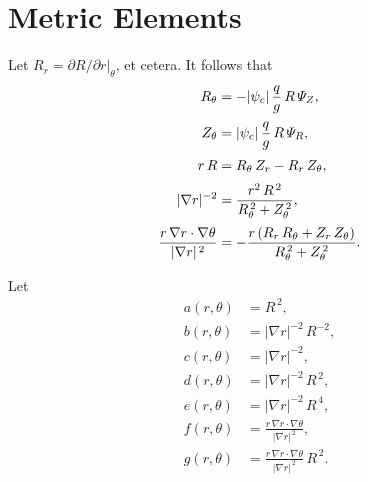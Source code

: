 \documentclass[notitlepage,12pt]{article}
\begin{document}
\section{Metric Elements}
Let $R_r=\left.\partial R/\partial r\right|_\theta$, et cetera. It follows that
\begin{align}
R_\theta&=-|\psi_c|\,\frac{q}{g}\,R\,{\mit\Psi}_Z,\\[0.5ex]
Z_\theta&= |\psi_c|\,\frac{q}{g}\,R\,{\mit\Psi}_R,\\[0.5ex]
r\,R&= R_\theta\,Z_r-R_r\,Z_\theta,\\[0.5ex]
|\nabla r|^{-2} &= \frac{r^2\,R^{\,2}}{R_\theta^{\,2} + Z_\theta^{\,2}},\\[0.5ex]
\frac{r\,\nabla r\cdot\nabla\theta}{|\nabla r|^{\,2}} &= -\frac{r\,(R_r\,R_\theta + Z_r\,Z_\theta)}{R_\theta^{\,2}+Z_\theta^{\,2}}.
\end{align}

Let 
\begin{align}
a(r,\theta)&= R^{\,2},\\[0.5ex]
b(r,\theta) &= |\nabla r|^{-2}\,R^{-2},\\[0.5ex]
c(r,\theta)&= |\nabla r|^{-2},\\[0.5ex]
d(r,\theta)&= |\nabla r|^{-2}\,R^{\,2},\\[0.5ex]
e(r,\theta)&=|\nabla r|^{-2}\,R^{\,4},\\[0.5ex]
f(r,\theta)&= \frac{r\,\nabla r\cdot\nabla\theta}{|\nabla r|^{\,2}},\\[0.5ex]
g(r,\theta)&=\frac{r\,\nabla r\cdot\nabla\theta}{|\nabla r|^{\,2}}\,R^{\,2}.
\end{align}
\end{document}
